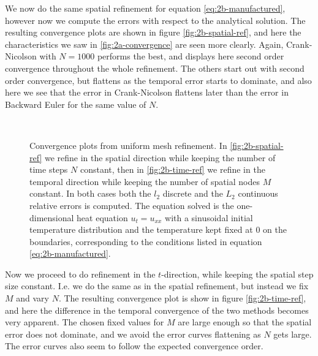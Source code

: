 We now do the same spatial refinement for equation \eqref{eq:2b-manufactured}, 
however now we compute the errors with respect to the analytical solution. 
The resulting convergence plots are shown in figure \ref{fig:2b-spatial-ref}, 
and here the characteristics we saw in \ref{fig:2a-convergence} are seen more clearly. 
Again, Crank-Nicolson with $N=1000$ performs the best, 
and displays here second order convergence throughout the whole refinement. 
The others start out with second order convergence, 
but flattens as the temporal error starts to dominate, 
and also here we see that the error in Crank-Nicolson flattens later than the error in Backward Euler for the same value of $N$. 
\begin{figure}
    \centering
     \\ \medskip
    \caption{
        Convergence plots from uniform mesh refinement. 
        In \ref{fig:2b-spatial-ref} we refine in the spatial direction while keeping the number of time steps $N$ constant, 
        then in \ref{fig:2b-time-ref} we refine in the temporal direction while keeping the number of spatial nodes $M$ constant. 
        In both cases both the $l_2$ discrete and the $L_2$ continuous relative errors is computed. 
        The equation solved is the one-dimensional heat equation $u_t=u_{xx}$ 
        with a sinusoidal initial temperature distribution and the temperature kept fixed at $0$ 
        on the boundaries, 
        corresponding to the conditions listed in equation \eqref{eq:2b-manufactured}. 
    }
\end{figure}

Now we proceed to do refinement in the $t$-direction, 
while keeping the spatial step size constant. 
I.e. we do the same as in the spatial refinement, 
but instead we fix $M$ and vary $N$. 
The resulting convergence plot is show in figure \ref{fig:2b-time-ref}, 
and here the difference in the temporal convergence of the two methods becomes very apparent. 
The chosen fixed values for $M$ are large enough so that the spatial error does not dominate, 
and we avoid the error curves flattening as $N$ gets large. 
The error curves also seem to follow the expected convergence order. 

